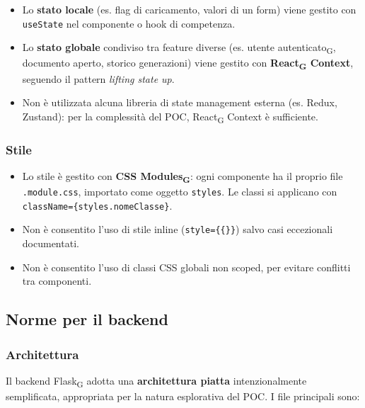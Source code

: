 \documentclass[11pt,a4paper]{article}
\newcommand{\gls}[1]{#1\textsubscript{G}}
\begin{document}
\begin{itemize}
    \item Lo \textbf{stato locale} (es. flag di caricamento, valori di un form) viene gestito con \texttt{useState} nel componente o hook di competenza.
    \item Lo \textbf{stato globale} condiviso tra feature diverse (es. \gls{utente autenticato}, documento aperto, storico generazioni) viene gestito con \textbf{\gls{React} Context}, seguendo il pattern \textit{lifting state up}.
    \item Non è utilizzata alcuna libreria di state management esterna (es. Redux, Zustand): per la complessità del POC, \gls{React} Context è sufficiente.
\end{itemize}
 
\subsubsection{Stile}
 
\begin{itemize}
    \item Lo stile è gestito con \textbf{\gls{CSS Modules}}: ogni componente ha il proprio file \texttt{.module.css}, importato come oggetto \texttt{styles}. Le classi si applicano con \texttt{className=\{styles.nomeClasse\}}.
    \item Non è consentito l'uso di stile inline (\texttt{style=\{\{\}\}}) salvo casi eccezionali documentati.
    \item Non è consentito l'uso di classi CSS globali non scoped, per evitare conflitti tra componenti.
\end{itemize}
 
\subsection{Norme per il backend}
 
\subsubsection{Architettura}
 
Il backend \gls{Flask} adotta una \textbf{architettura piatta} intenzionalmente semplificata, appropriata per la natura esplorativa del POC. I file principali sono:
 
\end{document}
